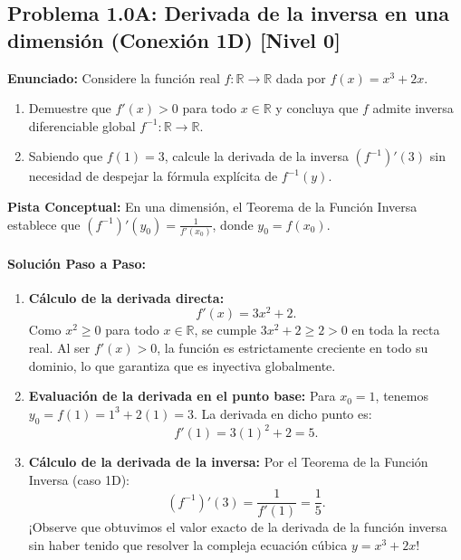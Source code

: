 \documentclass[11pt,a4paper]{article}
\begin{document}
\subsection*{Problema 1.0A: Derivada de la inversa en una dimensión (Conexión 1D) \hfill \color{teal}\small[Nivel 0]}

\begin{tcolorbox}[colback=white,colframe=gray!40,arc=1mm,boxrule=0.5pt,left=3mm,right=3mm,top=2mm,bottom=2mm]
\textbf{Enunciado:} Considere la función real $f: \mathbb{R} \to \mathbb{R}$ dada por $f(x) = x^3 + 2x$.
\begin{enumerate}[label=\textbf{\alph*)}]
\item Demuestre que $f'(x) > 0$ para todo $x \in \mathbb{R}$ y concluya que $f$ admite inversa diferenciable global $f^{-1}: \mathbb{R} \to \mathbb{R}$.
\item Sabiendo que $f(1) = 3$, calcule la derivada de la inversa $(f^{-1})'(3)$ sin necesidad de despejar la fórmula explícita de $f^{-1}(y)$.
\end{enumerate}
\end{tcolorbox}

\begin{tcolorbox}[colback=yellow!4,colframe=accentamber!70,arc=1mm,boxrule=0.5pt,left=3mm,right=3mm,top=1.5mm,bottom=1.5mm]
\textbf{Pista Conceptual:} En una dimensión, el Teorema de la Función Inversa establece que $(f^{-1})'(y_0) = \frac{1}{f'(x_0)}$, donde $y_0 = f(x_0)$.
\end{tcolorbox}

\paragraph{Solución Paso a Paso:}\par
\begin{enumerate}[label=\textbf{\arabic*.}]
\item \textbf{Cálculo de la derivada directa:}
\[ f'(x) = 3x^2 + 2. \]
Como $x^2 \ge 0$ para todo $x \in \mathbb{R}$, se cumple $3x^2 + 2 \ge 2 > 0$ en toda la recta real. Al ser $f'(x) > 0$, la función es estrictamente creciente en todo su dominio, lo que garantiza que es inyectiva globalmente.
\item \textbf{Evaluación de la derivada en el punto base:}
Para $x_0 = 1$, tenemos $y_0 = f(1) = 1^3 + 2(1) = 3$. La derivada en dicho punto es:
\[ f'(1) = 3(1)^2 + 2 = 5. \]
\item \textbf{Cálculo de la derivada de la inversa:}
Por el Teorema de la Función Inversa (caso 1D):
\[ (f^{-1})'(3) = \frac{1}{f'(1)} = \frac{1}{5}. \]
¡Observe que obtuvimos el valor exacto de la derivada de la función inversa sin haber tenido que resolver la compleja ecuación cúbica $y = x^3 + 2x$!
\end{enumerate}
\end{document}
